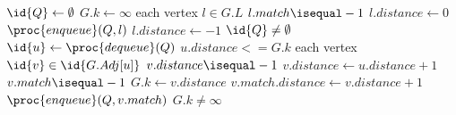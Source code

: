 \begin{codebox}
\li $\id{Q} \gets \emptyset$
\li $G.k \gets \infty$
\li \For each vertex $l \in G.L$ \Do
\li\If $l.match \isequal -1$ \Then
\li $l.distance \gets 0$
\li $\proc{enqueue}(Q, l)$
\li \Else
\li $l.distance \gets -1$ \End \End
\li \While $\id{Q} \neq \emptyset$ \Do
\li $\id{u} \gets \proc{dequeue}(Q)$
\li \If $u.distance <= G.k$ \Then
\li \For each vertex $\id{v} \in \id{G.Adj[u]}$ \Do
\li \If $v.distance \isequal -1$ \Then
\li $v.distance \gets u.distance + 1$
\li \If $v.match \isequal -1$ \Then
\li $G.k \gets v.distance$
\li \Else
\li $v.match.distance \gets v.distance + 1$
\li $\proc{enqueue}(Q, v.match)$ \End \End \End \End \End
\li \Return $G.k \neq \infty$
\end{codebox}